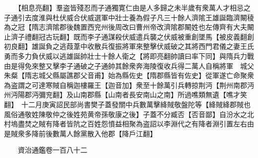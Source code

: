 　　【相息亮翻】羣盗皆殘忍而子通獨寛仁由是人多歸之未半歲有衆萬人才相忌之子通引去度淮與杜伏威合伏威選軍中壯士養為假子凡三十餘人濟隂王雄誕臨濟闞稜為之冠【隋志濟隂郡後魏置西兖州後周改曰曹州帝改濟隂郡闞姓也左傳齊有大夫闞止濟子禮翻冠古玩翻】既而李子通謀殺伏威遣兵襲之伏威被重創墜馬【被皮義翻創初良翻】雄誕負之逃葭葦中收散兵復振將軍來整擊伏威破之其將西門君儀之妻王氏勇而多力負伏威以逃雄誕帥壯士十餘人衛之【將即亮翻帥讀曰率下同】與隋兵力戰由是得免來整又擊李子通破之子通帥其餘衆奔海陵復收兵得二萬人自稱將軍　城父朱粲【隋志城父縣屬譙郡父音甫】始為縣佐史【隋郡縣皆有佐史】從軍遂亡命聚衆為盗謂之可達寒賊自稱迦樓羅王【迦音加】衆至十餘萬引兵轉掠荆沔【荆州南郡沔州沔陽郡沔彌兖翻】及山南郡縣【山南者長安南山之南】所過噍類無遺【噍才笑翻】　十二月庚寅詔民部尚書樊子蓋發關中兵數萬擊絳賊敬盤陀等【絳賊絳郡賊也風俗通敬姓陳敬仲之後姓苑黄帝孫敬康之後】子蓋不分臧否【否音鄙】自汾水之北村塢盡焚之賊有降者皆阬之百姓怨憤益相聚為盗詔以李淵代之有降者淵引置左右由是賊衆多降前後數萬人餘黨散入他郡【降戶江翻】

　　資治通鑑卷一百八十二  
    


 


 



 

 
  







 


　　
　　
　
　
　


　　

　















	
	









































